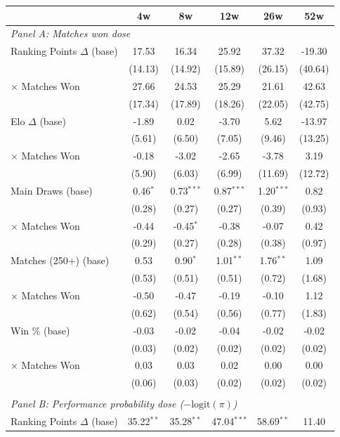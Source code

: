 \begin{tabular}{lccccc}
\toprule
 & 4w & 8w & 12w & 26w & 52w \\
\midrule
\multicolumn{6}{l}{\textit{Panel A: Matches won dose}} \\
\quad Ranking Points $\Delta$ (base) & 17.53 & 16.34 & 25.92 & 37.32 & -19.30 \\
 & (14.13) & (14.92) & (15.89) & (26.15) & (40.64) \\
\quad \quad $\times$ Matches Won & 27.66 & 24.53 & 25.29 & 21.61 & 42.63 \\
 & (17.34) & (17.89) & (18.26) & (22.05) & (42.75) \\[0.3em]
\quad Elo $\Delta$ (base) & -1.89 & 0.02 & -3.70 & 5.62 & -13.97 \\
 & (5.61) & (6.50) & (7.05) & (9.46) & (13.25) \\
\quad \quad $\times$ Matches Won & -0.18 & -3.02 & -2.65 & -3.78 & 3.19 \\
 & (5.90) & (6.03) & (6.99) & (11.69) & (12.72) \\[0.3em]
\quad Main Draws (base) & 0.46$^{*}$ & 0.73$^{***}$ & 0.87$^{***}$ & 1.20$^{***}$ & 0.82 \\
 & (0.28) & (0.27) & (0.27) & (0.39) & (0.93) \\
\quad \quad $\times$ Matches Won & -0.44 & -0.45$^{*}$ & -0.38 & -0.07 & 0.42 \\
 & (0.29) & (0.27) & (0.28) & (0.38) & (0.97) \\[0.3em]
\quad Matches (250+) (base) & 0.53 & 0.90$^{*}$ & 1.01$^{**}$ & 1.76$^{**}$ & 1.09 \\
 & (0.53) & (0.51) & (0.51) & (0.72) & (1.68) \\
\quad \quad $\times$ Matches Won & -0.50 & -0.47 & -0.19 & -0.10 & 1.12 \\
 & (0.62) & (0.54) & (0.56) & (0.77) & (1.83) \\[0.3em]
\quad Win \% (base) & -0.03 & -0.02 & -0.04 & -0.02 & -0.02 \\
 & (0.03) & (0.02) & (0.02) & (0.02) & (0.02) \\
\quad \quad $\times$ Matches Won & 0.03 & 0.03 & 0.02 & 0.00 & 0.00 \\
 & (0.06) & (0.03) & (0.02) & (0.02) & (0.02) \\[0.3em]
\\[0.5em]
\multicolumn{6}{l}{\textit{Panel B: Performance probability dose ($-\text{logit}(\pi)$)}} \\
\quad Ranking Points $\Delta$ (base) & 35.22$^{**}$ & 35.28$^{**}$ & 47.04$^{***}$ & 58.69$^{**}$ & 11.40 \\

\end{tabular}
